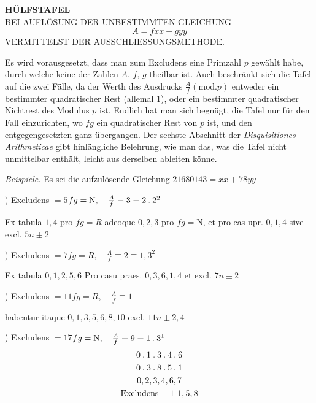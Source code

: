 \clearpage{}
\renewcommand{\BookRunningTitle}{Hülfstafel bei Auflösung der unbestimmten Gleichung}
\begin{center}
\textbf{HÜLFSTAFEL}\\[.7em]
BEI AUFLÖSUNG DER UNBESTIMMTEN GLEICHUNG
\[
A=fxx+gyy
\]
VERMITTELST DER AUSSCHLIESSUNGSMETHODE.
\end{center}
Es wird vorausgesetzt, dass man zum Excludens eine Primzahl $p$ gewählt habe, durch welche keine der Zahlen $A$, $f$, $g$ theilbar ist. Auch beschränkt sich die Tafel auf die zwei Fälle, da der Werth des Ausdrucks $\frac{A}{f}(\mathrm{mod}.p)$ entweder ein bestimmter quadratischer Rest (allemal $1$), oder ein bestimmter quadratischer Nichtrest des Modulus $p$ ist. Endlich hat man sich begnügt, die Tafel nur für den Fall einzurichten, wo $fg$ ein quadratischer Rest von $p$ ist, und den entgegengesetzten ganz übergangen. Der sechste Abschnitt der \textit{Disquisitiones Arithmeticae} gibt hinlängliche Belehrung, wie man das, was die Tafel nicht unmittelbar enthält, leicht aus derselben ableiten könne.
\par\medskip\textit{Beispiele.} Es sei die aufzulösende Gleichung $21680143=xx+78yy$
\par\medskip{}) Excludens $=5$\hfill $fg=\mathrm{N},\quad \frac{A}{f}\equiv3\equiv2\mathbin{.}2^2$
\par\noindent Ex tabula $1,4$ pro $fg=R$ adeoque $0,2,3$ pro $fg=\mathrm{N}$,
et pro cas upr. $0,1,4$ sive excl. $5n\pm2$
\par\medskip{}) Excludens $=7$\hfill $fg=R,\quad \frac{A}{f}\equiv2\equiv1,3^2$
\par\noindent Ex tabula $0,1,2,5,6$ Pro casu praes. $0,3,6,1,4$ et excl. $7n\pm2$
\par\medskip{}) Excludens $=11$\hfill $fg=R,\quad \frac{A}{f}\equiv1$
\par\noindent habentur itaque $0,1,3,5,6,8,10$ excl. $11n\pm2,4$
\par\medskip{}) Excludens $=17$\hfill $fg=\mathrm{N},\quad \frac{A}{f}\equiv9\equiv1\mathbin{.}3^1$
\[
\begin{gathered}
0\mathbin{.}1\mathbin{.}3\mathbin{.}4\mathbin{.}6\\
0\mathbin{.}3\mathbin{.}8\mathbin{.}5\mathbin{.}1\\
0,2,3,4,6,7\\
\text{Excludens}\quad\pm1,5,8
\end{gathered}
\]
